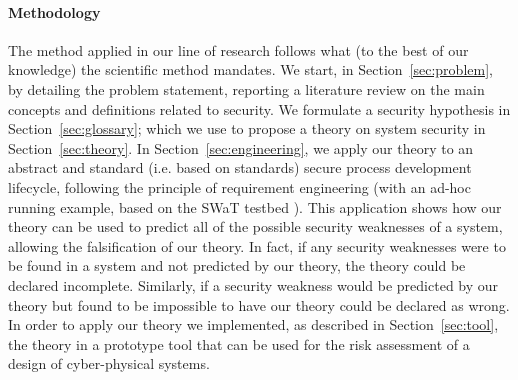 \paragraph{Methodology} The method applied in our line of research follows what
(to the best of our knowledge) the scientific method mandates. We start, in
Section~\ref{sec:problem}, by detailing the problem statement, reporting a
literature review on the main concepts and definitions related to security.  We
formulate 
a security hypothesis %
in Section~\ref{sec:glossary}; which we use to propose a theory on system
security in Section~\ref{sec:theory}. In Section~\ref{sec:engineering}, we
apply our theory to an abstract and standard (i.e.  based on standards) secure
process development lifecycle, following the principle of requirement
engineering  (with an ad-hoc running example, based on the SWaT testbed
\autocite{Mathur2016swat}). This application shows how our theory can be used
to predict all of the possible security weaknesses of a system, allowing the
falsification of our theory.  In fact, if any security weaknesses were to be
found in a system and not predicted by our theory, the theory could be declared
incomplete.  Similarly, if a security weakness would be predicted by our theory
but found to be impossible to have our theory could be declared as wrong.  In
order to apply our theory we implemented, as described in
Section~\ref{sec:tool}, the theory in a prototype tool that can be used for the
risk assessment of a design of cyber-physical systems.
